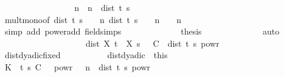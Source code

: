 \begin{isabellebody}
\ \ \ \ \ \ \ \ \ \ \isamarkupfalse%
\ \isamarkupfalse%
\ {\isachardoublequoteopen}{}\ {\isacharslash}{\kern0pt}\ {}\ {\isacharcircum}{\kern0pt}\ {\isacharparenleft}{\kern0pt}n\ {\isacharplus}{\kern0pt}\ n\ {\isasymle}\ dist\ t\ s{\isachardoublequoteclose}\isanewline
\ \ \ \ \ \ \ \ \ \ \ \ \isamarkupfalse%
\ mult{\isacharunderscore}{\kern0pt}mono{\isacharbrackleft}{\kern0pt}of\ {\isachardoublequoteopen}dist\ t\ s\ {\isacharasterisk}{\kern0pt}\ {}\ {\isacharcircum}{\kern0pt}\ n{\isachardoublequoteclose}\ {\isachardoublequoteopen}dist\ t\ s\ {\isacharasterisk}{\kern0pt}\ {}\ {\isacharcircum}{\kern0pt}\ n{\isachardoublequoteclose}\ {\isachardoublequoteopen}{}{\isachardoublequoteclose}\ {\isachardoublequoteopen}{}\ {\isacharcircum}{\kern0pt}\ n\ \isanewline
\ \ \ \ \ \ \ \ \ \ \ \ \isamarkupfalse%
\ {\isacharparenleft}{\kern0pt}simp\ add{\isacharcolon}{\kern0pt}\ power{\isacharunderscore}{\kern0pt}add\ field{\isacharunderscore}{\kern0pt}simps{\isacharparenright}{\kern0pt}\isanewline
\ \ \ \ \ \ \ \ \ \ \isamarkupfalse%
\ \isamarkupfalse%
\ {\isacharquery}{\kern0pt}thesis\isanewline
\ \ \ \ \ \ \ \ \ \ \ \ \isamarkupfalse%
\ auto\isanewline
\ \ \ \ \ \ \ \ \isamarkupfalse%
\isanewline
\ \ \ \ \ \ \ \ \isamarkupfalse%
\ \isamarkupfalse%
\ {\isachardoublequoteopen}dist\ {\isacharparenleft}{\kern0pt}X\ t\ {\isasymomega}{\isacharparenright}{\kern0pt}\ {\isacharparenleft}{\kern0pt}X\ s\ {\isasymomega}{\isacharparenright}{\kern0pt}\ {\isasymle}\ {\isacharquery}{\kern0pt}C\ {\isacharasterisk}{\kern0pt}\ {\isacharparenleft}{\kern0pt}dist\ t\ s{\isacharparenright}{\kern0pt}\ powr\ {\isasymgamma}{\isachardoublequoteclose}\isanewline
\ \ \ \ \ \ \ \ \ \ \isamarkupfalse%
\ dist{\isacharunderscore}{\kern0pt}dyadic{\isacharunderscore}{\kern0pt}fixed\ \isamarkupfalse%
\isanewline
\ \ \ \ \ \ \isacommand{{\isacharbraceright}{\kern0pt}}\isamarkupfalse%
\ \isamarkupfalse%
\ dist{\isacharunderscore}{\kern0pt}dyadic\ {\isacharequal}{\kern0pt}\ this\isanewline
\ \ \ \ \ \ \isamarkupfalse%
\ {\isacharquery}{\kern0pt}K\ {\isacharequal}{\kern0pt}\ {\isachardoublequoteopen}{\isasymlambda}t\ s{\isachardot}{\kern0pt}\ {\isacharquery}{\kern0pt}C\ {\isacharasterisk}{\kern0pt}\ {}\ powr\ {\isacharparenleft}{\kern0pt}{\isacharparenleft}{\kern0pt}{}{\isacharminus}{\kern0pt}{\isasymgamma}{\isacharparenright}{\kern0pt}\ {\isacharasterisk}{\kern0pt}\ n\ {\isacharasterisk}{\kern0pt}\ {\isacharparenleft}{\kern0pt}dist\ t\ s{\isacharparenright}{\kern0pt}\ powr\ {\isasymgamma}{\isachardoublequoteclose}\isanewline

\end{isabellebody}
